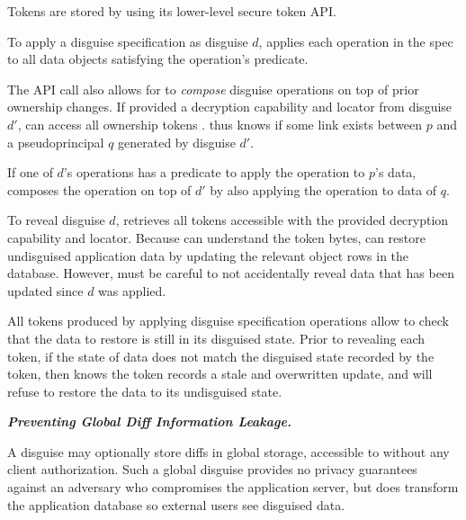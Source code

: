 Tokens are stored by \sys using its lower-level secure token API.

To apply a disguise specification as disguise $d$, \sys applies each operation in the spec to
all data objects satisfying the operation's predicate. 

The  API call also allows for \sys to \emph{compose} disguise operations on top of
prior ownership changes.
If provided a decryption capability and locator  from disguise $d'$, \sys can access all ownership tokens
. \sys thus knows if some link exists between $p$ and a pseudoprincipal $q$ generated by
disguise $d'$.

If one of $d$'s operations has a predicate to apply the operation to $p$'s data, \sys
composes the operation on top of $d'$ by also applying the operation to data of $q$.

To reveal disguise $d$, \sys retrieves all tokens accessible with the provided decryption capability
and locator. Because \sys can understand the token bytes, \sys can restore undisguised application
data by updating the relevant object rows in the database.  However, \sys must be
careful to not accidentally reveal data that has been updated since $d$ was applied.  

All tokens produced by applying disguise specification operations allow \sys to check that the data
to restore is still in its disguised state. Prior to revealing each token, if the state of data does
not match the disguised state recorded by the token, then \sys knows the token records a stale and
overwritten update, and will refuse to restore the data to its undisguised state.

\iffalse
\vspace{6pt}\noindent\textbf{\emph{Preventing Global Diff Information Leakage.}}

%
A disguise may optionally store diffs in global storage, accessible to \sys without any client
authorization.
Such a global disguise provides no privacy guarantees against an adversary who compromises 
the application server, but does transform the application database so external users see disguised
data.

